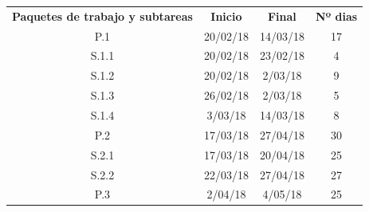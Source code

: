 \begin{table}[H]
\centering
\begin{tabular}{cccc}
\rowcolor[HTML]{3531FF} 
{\color[HTML]{FFFFFF} \textbf{Paquetes de trabajo y subtareas}} & {\color[HTML]{FFFFFF} \textbf{Inicio}}   & {\color[HTML]{FFFFFF} \textbf{Final}}   & {\color[HTML]{FFFFFF} \textbf{Nº dias}} \\
\rowcolor[HTML]{FD6864} 
P.1                                                             & 20/02/18                                 & 14/03/18                                & 17                                      \\
\rowcolor[HTML]{FFCCC9} 
S.1.1                                                           & 20/02/18                                 & 23/02/18                                & 4                                       \\
\rowcolor[HTML]{FFCCC9} 
S.1.2                                                           & 20/02/18                                 & 2/03/18                                 & 9                                       \\
\rowcolor[HTML]{FFCCC9} 
S.1.3                                                           & 26/02/18                                 & 2/03/18                                 & 5                                       \\
\rowcolor[HTML]{FFCCC9} 
S.1.4                                                           & 3/03/18                                  & 14/03/18                                & 8                                       \\
\rowcolor[HTML]{FE996B} 
P.2                                                             & 17/03/18                                 & 27/04/18                                & 30                                      \\
\rowcolor[HTML]{FFCE93} 
S.2.1                                                           & 17/03/18                                 & 20/04/18                                & 25                                      \\
\rowcolor[HTML]{FFCE93} 
S.2.2                                                           & 22/03/18                                 & 27/04/18                                & 27                                      \\
\rowcolor[HTML]{FFFE65} 
P.3                                                             & 2/04/18                                  & 4/05/18                                 & 25                                      \\

\end{tabular}
\end{table}

